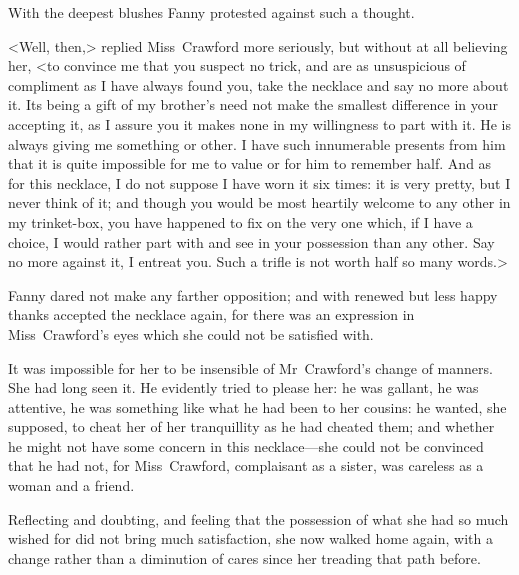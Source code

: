 With the deepest blushes Fanny protested against such a thought.

<Well, then,> replied Miss~Crawford more seriously, but without at all believing her, <to convince me that you suspect no trick, and are as unsuspicious of compliment as I have always found you, take the necklace and say no more about it. Its being a gift of my brother's need not make the smallest difference in your accepting it, as I assure you it makes none in my willingness to part with it. He is always giving me something or other. I have such innumerable presents from him that it is quite impossible for me to value or for him to remember half. And as for this necklace, I do not suppose I have worn it six times: it is very pretty, but I never think of it; and though you would be most heartily welcome to any other in my trinket-box, you have happened to fix on the very one which, if I have a choice, I would rather part with and see in your possession than any other. Say no more against it, I entreat you. Such a trifle is not worth half so many words.>

Fanny dared not make any farther opposition; and with renewed but less happy thanks accepted the necklace again, for there was an expression in Miss~Crawford's eyes which she could not be satisfied with.

It was impossible for her to be insensible of Mr~Crawford's change of manners. She had long seen it. He evidently tried to please her: he was gallant, he was attentive, he was something like what he had been to her cousins: he wanted, she supposed, to cheat her of her tranquillity as he had cheated them; and whether he might not have some concern in this necklace—she could not be convinced that he had not, for Miss~Crawford, complaisant as a sister, was careless as a woman and a friend.

Reflecting and doubting, and feeling that the possession of what she had so much wished for did not bring much satisfaction, she now walked home again, with a change rather than a diminution of cares since her treading that path before. 